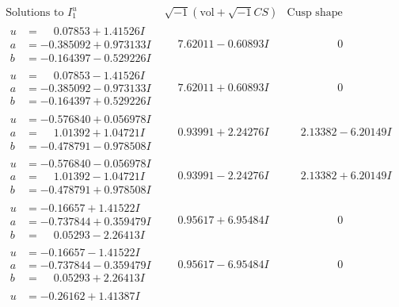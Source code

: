 \documentclass[1p]{elsarticle_modified}
\theoremstyle{definition}
\newcommand{\I}{\sqrt{-1}}
\begin{document}
$$\begin{array}{c|c|c}
\text{Solutions to }I^u_{1}& \I (\text{vol} + \sqrt{-1}CS) & \text{Cusp shape}\\
 \hline 
\begin{aligned}
u &= \phantom{-}0.07853 + 1.41526 I \\
a &= -0.385092 + 0.973133 I \\
b &= -0.164397 - 0.529226 I\end{aligned}
 & \phantom{-}7.62011 - 0.60893 I & \phantom{-0.000000 } 0 \\ \hline\begin{aligned}
u &= \phantom{-}0.07853 - 1.41526 I \\
a &= -0.385092 - 0.973133 I \\
b &= -0.164397 + 0.529226 I\end{aligned}
 & \phantom{-}7.62011 + 0.60893 I & \phantom{-0.000000 } 0 \\ \hline\begin{aligned}
u &= -0.576840 + 0.056978 I \\
a &= \phantom{-}1.01392 + 1.04721 I \\
b &= -0.478791 - 0.978508 I\end{aligned}
 & \phantom{-}0.93991 + 2.24276 I & \phantom{-}2.13382 - 6.20149 I \\ \hline\begin{aligned}
u &= -0.576840 - 0.056978 I \\
a &= \phantom{-}1.01392 - 1.04721 I \\
b &= -0.478791 + 0.978508 I\end{aligned}
 & \phantom{-}0.93991 - 2.24276 I & \phantom{-}2.13382 + 6.20149 I \\ \hline\begin{aligned}
u &= -0.16657 + 1.41522 I \\
a &= -0.737844 + 0.359479 I \\
b &= \phantom{-}0.05293 - 2.26413 I\end{aligned}
 & \phantom{-}0.95617 + 6.95484 I & \phantom{-0.000000 } 0 \\ \hline\begin{aligned}
u &= -0.16657 - 1.41522 I \\
a &= -0.737844 - 0.359479 I \\
b &= \phantom{-}0.05293 + 2.26413 I\end{aligned}
 & \phantom{-}0.95617 - 6.95484 I & \phantom{-0.000000 } 0 \\ \hline\begin{aligned}
u &= -0.26162 + 1.41387 I \\

\end{aligned}
\end{array}$$
\end{document}
